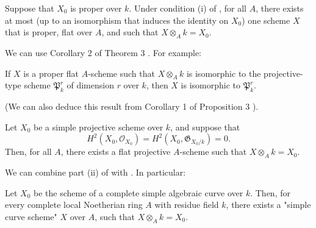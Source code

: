 \begin{corollary}\label{fga2-theorem-9-corollary-1}
    Suppose that $X_0$ is proper over $k$.
    Under condition (i) of , for all $A$, there exists at most (up to an isomorphism that induces the identity on $X_0$) one scheme $X$ that is proper, flat over $A$, and such that $X\otimes_Ak=X_0$.
\end{corollary}


We can use Corollary 2 of Theorem 3 .
For example:


\begin{corollary}\label{fga2-theorem-9-corollary-2}
    If $X$ is a proper flat $A$-scheme such that $X\otimes_A k$ is isomorphic to the projective-type scheme $\mathfrak{P}_k^r$ of dimension $r$ over $k$, then $X$ is isomorphic to $\mathfrak{P}_k^r$.
\end{corollary}


(We can also deduce this result from Corollary 1 of Proposition 3 ).


\begin{corollary}\label{fga2-theorem-9-corollary-3}
    Let $X_0$ be a simple projective scheme over $k$, and suppose that
    \[
        H^2(X_0,\mathcal{O}_{X_0})
        = H^2(X_0,\mathfrak{G}_{X_0/k})
        = 0.
    \]
    Then, for all $A$, there exists a flat projective $A$-scheme such that $X\otimes_Ak=X_0$.
\end{corollary}


We can combine part (ii) of  with .
In particular:

\begin{corollary}\label{fga2-theorem-9-corollary-4}
    Let $X_0$ be the scheme of a complete simple algebraic curve over $k$.
    Then, for every complete local Noetherian ring $A$ with residue field $k$, there exists a "simple curve scheme" $X$ over $A$, such that $X\otimes_Ak=X_0$.
\end{corollary}

